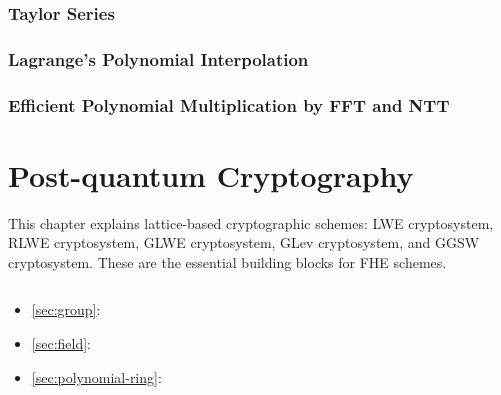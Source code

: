 \documentclass[11pt]{article}
\begin{document}
\clearpage

\section{Taylor Series}
\label{sec:taylor-series}


\clearpage

\section{Lagrange's Polynomial Interpolation}
\label{sec:polynomial-interpolation}


\clearpage

\section{Efficient Polynomial Multiplication by FFT and NTT}
\label{sec:ntt}


\clearpage





\part{Post-quantum Cryptography}
\label{part:pqc}

\renewcommand{\thesection}{B-\arabic{section}}
\setcounter{section}{0}

This chapter explains lattice-based cryptographic schemes: LWE cryptosystem, RLWE cryptosystem, GLWE cryptosystem, GLev cryptosystem, and GGSW cryptosystem. These are the essential building blocks for FHE schemes. 


$ $

\begin{tcolorbox}[
    title = \textbf{Required Background},    %
    colback = white,    %
    colframe = black,  %
    boxrule = 0.8pt,     %
    left = 1mm, right = 1mm, top = 1mm, bottom = 1mm %
]



\begin{itemize}
\item \autoref{sec:group}: 
\item \autoref{sec:field}: 
\item \autoref{sec:polynomial-ring}: 
\end{itemize}

\end{tcolorbox}
\end{document}
